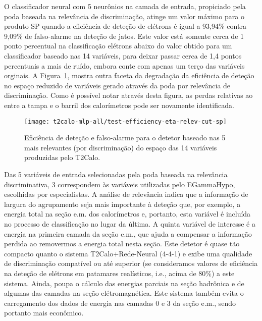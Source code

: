 O classificador neural com 5 neurônios na camada de entrada, propiciado pela
poda baseada na relevância de discriminação, atinge um valor máximo para o
produto SP quando a eficiência de deteção de elétrons é igual a 93,94\% contra
9,09\% de falso-alarme na deteção de jatos. Este valor está somente cerca de 1
ponto percentual na classificação elétrons abaixo do valor obtido para um
classificador baseado nas 14 variáveis, para deixar passar cerca de 1,4 pontos
percentuais a mais de ruído, embora conte com apenas um terço das variáveis
orginais. A Figura~\ref{fig:t2calo-mlp-all-test-efficiency-eta-relev-cut-sp},
mostra outra faceta da degradação da eficiência de deteção no espaço reduzido
de variáveis gerado através da poda por relevância de discriminação. Como é
possível notar através desta figura, as perdas relativas ao  entre
a tampa e o barril dos calorímetros pode ser novamente identificada.

\begin{figure}
\begin{center}
\texttt{[image: t2calo-mlp-all/test-efficiency-eta-relev-cut-sp]}
\end{center}
\caption{Eficiência de deteção e falso-alarme para o detetor baseado nas 5
mais relevantes (por discriminação) do espaço das 14 variáveis produzidas pelo
T2Calo.}
\label{fig:t2calo-mlp-all-test-efficiency-eta-relev-cut-sp}
\end{figure}

Das 5 variáveis de entrada selecionadas pela poda baseada na relevância
discriminativa, 3 correspondem às variáveis utilizadas pelo EGammaHypo,
escolhidas por especialistas. A análise de relevância indica que a informação
de largura do agrupamento seja mais importante à deteção que, por exemplo, a
energia total na seção e.m. dos calorímetros e, portanto, esta variável é
incluída no processo de classificação no lugar da última. A quinta variável de
interesse é a energia na primeira camada da seção e.m., que ajuda a compensar
a informação perdida ao removermos a energia total nesta seção. Este detetor é
quase tão compacto quanto o sistema T2Calo+Rede-Neural (4-4-1) e exibe uma
qualidade de discriminação compatível ou até superior (se consideramos valores
de eficiência na deteção de elétrons em patamares realísticos, i.e., acima de
80\%) a este sistema. Ainda, poupa o cálculo das energias parciais na seção
hadrônica e de algumas das camadas na seção elétromagnética. Este sistema
também evita o carregamento dos dados de energia nas camadas 0 e 3 da seção
e.m., sendo portanto mais econômico.

